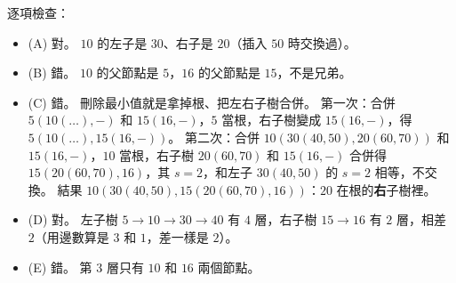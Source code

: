 \begin{pastsoln}
逐項檢查：
\begin{itemize}
\item (A) 對。 $10$ 的左子是 $30$、右子是 $20$（插入 $50$ 時交換過）。
\item (B) 錯。 $10$ 的父節點是 $5$，$16$ 的父節點是 $15$，不是兄弟。
\item (C) 錯。 刪除最小值就是拿掉根、把左右子樹合併。 第一次：合併 $5(10(\ldots), -)$ 和 $15(16, -)$，$5$ 當根，右子樹變成
$15(16, -)$，得 $5(10(\ldots), 15(16, -))$。 第二次：合併 $10(30(40, 50), 20(60, 70))$ 和 $15(16, -)$，$10$ 當根，右子樹
$20(60, 70)$ 和 $15(16, -)$ 合併得 $15(20(60, 70), 16)$，其 $s = 2$，和左子 $30(40, 50)$ 的 $s = 2$ 相等，不交換。 結果
$10(30(40, 50), 15(20(60, 70), 16))$：$20$ 在根的\textbf{右}子樹裡。
\item (D) 對。 左子樹 $5 \to 10 \to 30 \to 40$ 有 $4$ 層，右子樹 $15 \to 16$ 有 $2$ 層，相差 $2$（用邊數算是 $3$ 和 $1$，差一樣是 $2$）。
\item (E) 錯。 第 $3$ 層只有 $10$ 和 $16$ 兩個節點。
\end{itemize}
\end{pastsoln}
